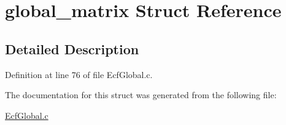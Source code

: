 \hypertarget{structglobal__matrix}{\section{global\-\_\-matrix Struct Reference}
\label{structglobal__matrix}
}


\subsection{Detailed Description}


Definition at line 76 of file Ecf\-Global.\-c.



The documentation for this struct was generated from the following file\-:\begin{DoxyCompactItemize}
\item 
\hyperlink{_ecf_global_8c}{Ecf\-Global.\-c}\end{DoxyCompactItemize}
